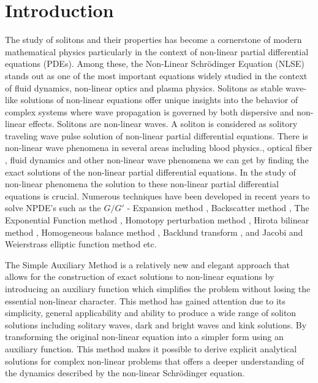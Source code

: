 \documentclass[10pt]{NSP1}
\numberwithin{equation}{section}
\begin{document}
\maketitle

\section{Introduction}

The study of solitons and their properties has become a cornerstone of modern mathematical physics particularly in the context of non-linear partial differential equations (PDEs). Among these, the Non-Linear Schr\"odinger Equation (NLSE) stands out as one of the most important equations widely studied in the context of fluid dynamics, non-linear optics and plasma physics. Solitons as stable wave-like solutions of non-linear equations offer unique insights into the behavior of complex systems where wave propagation is governed by both dispersive and non-linear effects. Solitons are non-linear waves. A soliton is considered as solitory traveling wave pulse solution of non-linear partial differential equations. There is non-linear wave phenomena in several areas including blood physics.\cite{A1,A2,A3}, optical fiber \cite{a4,a5,a6,a7}, fluid dynamics \cite{a8,a9} and other non-linear wave phenomena we can get by finding the exact solutions of the non-linear partial differential equations. In the study of non-linear phenomena the solution to these non-linear partial differential equations is crucial. Numerous techniques have been developed in recent years to solve NPDE's such as the $G/G'$ - Expansion method \cite{a8}, Backscatter method \cite{a10}, The Exponential Function method \cite{a11}, Homotopy perturbation method \cite{a12}, Hirota bilinear method \cite{a13}, Homogeneous balance method \cite{a14}, Backlund transform \cite{a15}, and Jacobi and Weierstrass elliptic function method \cite{a16} etc.

The Simple Auxiliary Method is a relatively new and elegant approach that allows for the construction of exact solutions to non-linear equations by introducing an auxiliary function which simplifies the problem without losing the essential non-linear character. This method has gained attention due to its simplicity, general applicability and ability to produce a wide range of soliton solutions including solitary waves, dark and bright waves and kink solutions. By transforming the original non-linear equation into a simpler form using an auxiliary function. This method makes it possible to derive explicit analytical solutions for complex non-linear problems that offers a deeper understanding of the dynamics described by the non-linear Schr\"odinger equation.
\end{document}
